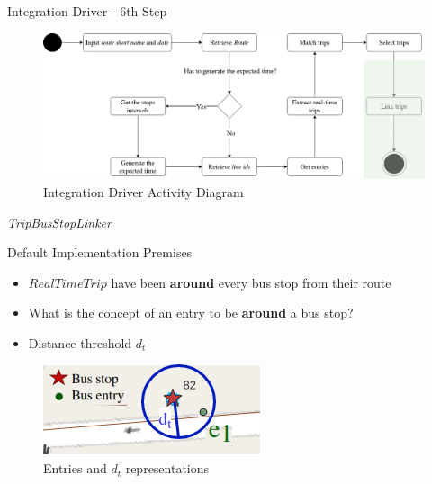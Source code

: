 \documentclass[xcolor=dvipsnames,table]{beamer}
\begin{document}
\begin{frame}{Integration Driver - 6th Step}
        \begin{figure}[H]
                \centering
                \includegraphics[width = \textwidth]{images/integrationDriverAD(6th_step).png}
                \caption{Integration Driver Activity Diagram}
        \end{figure}
\end{frame}
\begin{frame}{\textit{TripBusStopLinker}}
        \begin{block}{Default Implementation Premises}
                \begin{itemize}
                        \item $RealTimeTrip$ have
                                been \textbf{around} every bus stop from their route
                        \item What is the concept of an entry to be \textbf{around} a bus stop?
                        \item Distance threshold $d_t$
                \end{itemize}
        \end{block}
        \begin{figure}[H]
                \centering
                \includegraphics[scale=.6]{images/entriesDT.drawio.png}
                \caption{Entries and $d_t$ representations}
        \end{figure}
\end{frame}
\end{document}

